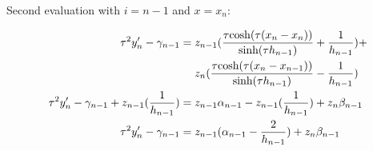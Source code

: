 \documentclass{article}
\begin{document}
  Second evaluation with $i=n-1$ and $x = x_n$:

  \begin{align*}
           \tau^2y'_n
           -
           \gamma_{n-1}
           &=
           z_{n-1}
           (
             \frac{
               \tau\mathrm{cosh}(\tau(x_{n}-x_n))
             }
             {
               \textrm{sinh}(\tau h_{n-1})
             }
             +
             \frac {
               1
             }
             {
               h_{n-1}
             }
           )
           +
           \\
           &\ \hspace{0.35cm} z_{n}
           (
             \frac{
               \tau\textrm{cosh}(\tau(x_n-x_{n-1}))
             }
             {
               \textrm{sinh}(\tau h_{n-1})
             }
             -
             \frac {
               1
             }
             {
               h_{n-1}
             }
           )
           \\
           \tau^2y'_n
           -
           \gamma_{n-1}
           +
           z_{n-1}
           (
             \frac {
               1
             }
             {
               h_{n-1}
             }
           )
           &=
           z_{n-1} \alpha_{n-1}
           -
           z_{n-1}
           (
             \frac {
               1
             }
             {
               h_{n-1}
             }
           )
           +
           z_{n}\beta_{n-1}
           \\
           \tau^2y'_n
           -
           \gamma_{n-1}
           &=
           z_{n-1}
           (
             \alpha_{n-1}
             -
             \frac {
               2
             }
             {
               h_{n-1}
             }
           )
           +
           z_{n}\beta_{n-1}
  \end{align*}
\end{document}
